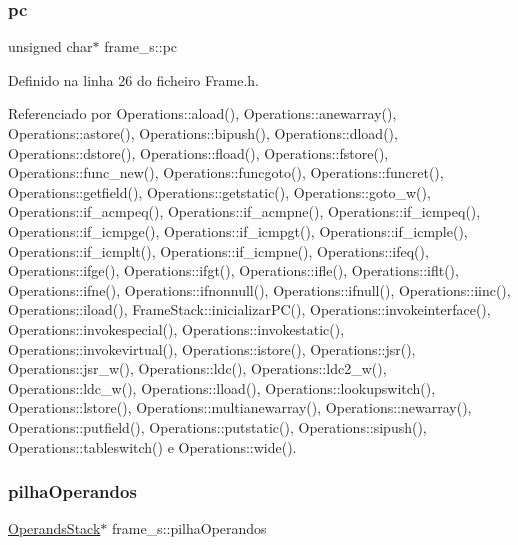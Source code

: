 \mbox{\label{structframe__s_a74703c716b34b0be42af1c698ef9f621}} 
\subsubsection{\texorpdfstring{pc}{pc}}
{\footnotesize\ttfamily unsigned char$\ast$ frame\+\_\+s\+::pc}



Definido na linha 26 do ficheiro Frame.\+h.



Referenciado por Operations\+::aload(), Operations\+::anewarray(), Operations\+::astore(), Operations\+::bipush(), Operations\+::dload(), Operations\+::dstore(), Operations\+::fload(), Operations\+::fstore(), Operations\+::func\+\_\+new(), Operations\+::funcgoto(), Operations\+::funcret(), Operations\+::getfield(), Operations\+::getstatic(), Operations\+::goto\+\_\+w(), Operations\+::if\+\_\+acmpeq(), Operations\+::if\+\_\+acmpne(), Operations\+::if\+\_\+icmpeq(), Operations\+::if\+\_\+icmpge(), Operations\+::if\+\_\+icmpgt(), Operations\+::if\+\_\+icmple(), Operations\+::if\+\_\+icmplt(), Operations\+::if\+\_\+icmpne(), Operations\+::ifeq(), Operations\+::ifge(), Operations\+::ifgt(), Operations\+::ifle(), Operations\+::iflt(), Operations\+::ifne(), Operations\+::ifnonnull(), Operations\+::ifnull(), Operations\+::iinc(), Operations\+::iload(), Frame\+Stack\+::inicializar\+P\+C(), Operations\+::invokeinterface(), Operations\+::invokespecial(), Operations\+::invokestatic(), Operations\+::invokevirtual(), Operations\+::istore(), Operations\+::jsr(), Operations\+::jsr\+\_\+w(), Operations\+::ldc(), Operations\+::ldc2\+\_\+w(), Operations\+::ldc\+\_\+w(), Operations\+::lload(), Operations\+::lookupswitch(), Operations\+::lstore(), Operations\+::multianewarray(), Operations\+::newarray(), Operations\+::putfield(), Operations\+::putstatic(), Operations\+::sipush(), Operations\+::tableswitch() e Operations\+::wide().

\mbox{\label{structframe__s_a39f21b480e26b73443d41e72d1338266}} 
\subsubsection{\texorpdfstring{pilha\+Operandos}{pilhaOperandos}}
{\footnotesize\ttfamily \hyperlink{classOperandsStack}{Operands\+Stack}$\ast$ frame\+\_\+s\+::pilha\+Operandos}



